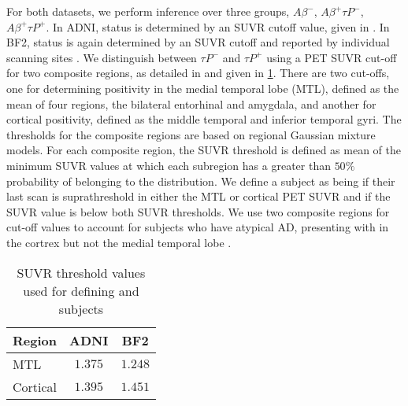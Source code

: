 For both datasets, we perform inference over three groups, $A\beta^{-}$,
$A\beta^{+} \tau P^{-}$, $A\beta^{+} \tau P^{+}$. In ADNI, \AB status is
determined by an SUVR cutoff value, given in \cite{landau2016florbetapir}. In
BF2, \AB status is again determined by an SUVR cutoff and reported by individual
scanning sites \cite{ossenkoppele2022amyloid}. We distinguish
between $\tau P^{-}$ and $\tau P^{+}$ using a \TP PET SUVR cut-off for two
composite regions, as detailed in \cite{ossenkoppele2022amyloid} and given in
\cref{table:cutoffs}. There are two cut-offs, one for determining \TP
positivity in the medial temporal lobe (MTL), defined as the mean of four
regions, the bilateral entorhinal and amygdala, and another for cortical
positivity, defined as the middle temporal and inferior temporal gyri. The
thresholds for the composite regions are based on regional Gaussian mixture
models. For each composite region, the SUVR  
threshold is defined as mean of the minimum SUVR values at which each subregion
has a greater than $50\%$ probability of belonging to the \TPP distribution. We
define a subject as being \TPP if their last scan is suprathreshold in either
the MTL or cortical \TP PET SUVR and \TPN if the SUVR value is below both SUVR
thresholds. We use two composite regions for cut-off values to account for 
subjects who have atypical AD, presenting with \TP in the cortrex but not the 
medial temporal lobe \cite{vogel2021four}.

\begin{table}[h]
    \centering
    \begin{tabular}{|l|c|c|}
        \hline
        \textbf{Region} & \textbf{ADNI} & \textbf{BF2}  \\
        \hline
        MTL & $1.375$ & $1.248 $\\
        Cortical & $1.395$ & $1.451$  \\
        \hline
    \end{tabular}
    \caption{SUVR threshold values used for defining \TPP and \TPN subjects}
    \label{table:cutoffs}
\end{table}


